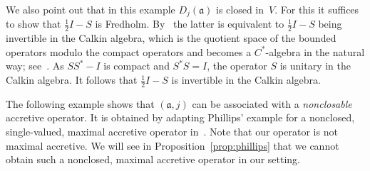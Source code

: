 \documentclass[a4paper,oneside,12pt]{amsart}
\theoremstyle{plain}
\theoremstyle{definition}
\newenvironment{example}
{\pushQED{\qed}

\examplex}
{\popQED\endexamplex}
\begin{document}
\begin{example}
We also point out that in this example $D_j({{\mathfrak{{a}}}})$ is closed in~$V$.
For this it suffices to show that $\tfrac{1}{2}I-S$ is Fredholm.
By~\cite[Theorem 5.17]{Dou72} the latter is equivalent to $\tfrac{1}{2}I-S$ being invertible in the Calkin algebra,
which is the quotient space of the bounded operators modulo the compact operators and becomes a $C^*$-algebra in the natural way; 
see~\cite[Chapter~5]{Dou72}.
As $SS^*-I$ is compact and $S^*S=I$, the operator $S$ is unitary in the Calkin algebra.
It follows that $\tfrac{1}{2}I-S$ is invertible in the Calkin algebra.
\end{example}

The following example shows that $({{\mathfrak{{a}}}},j)$ can be associated with a \emph{nonclosable} accretive operator.
It is obtained by adapting Phillips' example for a nonclosed, single-valued, maximal accretive operator in~\cite[Footnote~6]{Phi59}.
Note that our operator is not maximal accretive.
We will see in Proposition~\ref{prop:phillips} that
we cannot obtain such a nonclosed, maximal accretive operator in our setting.
\end{document}
